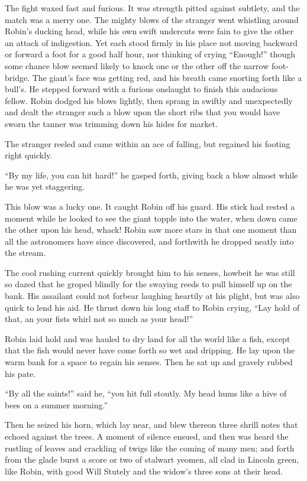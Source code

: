 The fight waxed fast and furious. It was strength pitted against
subtlety, and the match was a merry one. The mighty blows of the
stranger went whistling around Robin's ducking head, while his own swift
undercuts were fain to give the other an attack of indigestion. Yet each
stood firmly in his place not moving backward or forward a foot for a
good half hour, nor thinking of crying ``Enough!'' though some chance
blow seemed likely to knock one or the other off the narrow foot-bridge.
The giant's face was getting red, and his breath came snorting forth
like a bull's. He stepped forward with a furious onslaught to finish
this audacious fellow. Robin dodged his blows lightly, then sprang in
swiftly and unexpectedly and dealt the stranger such a blow upon the
short ribs that you would have sworn the tanner was trimming down his
hides for market.

The stranger reeled and came within an ace of falling, but regained his
footing right quickly.

``By my life, you can hit hard!'' he gasped forth, giving back a blow
almost while he was yet staggering.

This blow was a lucky one. It caught Robin off his guard. His stick had
rested a moment while he looked to see the giant topple into the water,
when down came the other upon his head, whack! Robin saw more stars in
that one moment than all the astronomers have since discovered, and
forthwith he dropped neatly into the stream.

The cool rushing current quickly brought him to his senses, howbeit he
was still so dazed that he groped blindly for the swaying reeds to pull
himself up on the bank. His assailant could not forbear laughing
heartily at his plight, but was also quick to lend his aid. He thrust
down his long staff to Robin crying, ``Lay hold of that, an your fists
whirl not so much as your head!''

Robin laid hold and was hauled to dry land for all the world like a
fish, except that the fish would never have come forth so wet and
dripping. He lay upon the warm bank for a space to regain his senses.
Then he sat up and gravely rubbed his pate.

``By all the saints!'' said he, ``you hit full stoutly. My head hums
like a hive of bees on a summer morning.''

Then he seized his horn, which lay near, and blew thereon three shrill
notes that echoed against the trees. A moment of silence ensued, and
then was heard the rustling of leaves and crackling of twigs like the
coming of many men; and forth from the glade burst a score or two of
stalwart yeomen, all clad in Lincoln green, like Robin, with good Will
Stutely and the widow's three sons at their head.

